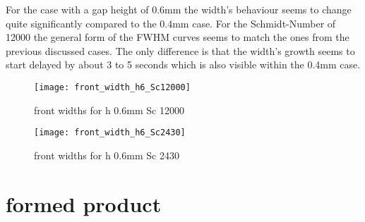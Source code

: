 \documentclass[../thesis.tex]{subfiles}
\begin{document}
For the case with a gap height of 0.6mm the width's behaviour seems to change quite significantly compared to the 0.4mm case. For the Schmidt-Number of 12000 the general form of the FWHM curves seems to match the ones from the previous discussed cases. The only difference is that the width's growth seems to start delayed by about 3 to 5 seconds which is also visible within the 0.4mm case.
\begin{figure}[htbp]
	\centering
	\texttt{[image: front\_width\_h6\_Sc12000]}
	\caption{front widths for h 0.6mm Sc 12000\label{fig: front_width_h6_Sc12000}}\bigskip
	\texttt{[image: front\_width\_h6\_Sc2430]}
	\caption{front widths for h 0.6mm Sc 2430\label{fig: front_width_pos_h6_Sc2430}}
\end{figure}

\section{formed product}
\end{document}
